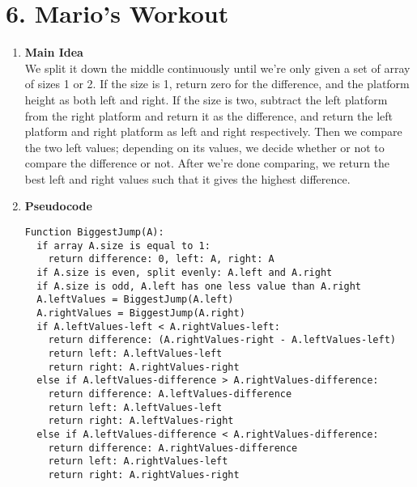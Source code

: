 \documentclass[11pt]{article}
\newenvironment{qparts}{\begin{enumerate}[{(}a{)}]}{\end{enumerate}}
\begin{document}
\section*{6. Mario's Workout}
\begin{qparts}
	\item[] \textbf{Main Idea} \\
		We split it down the middle continuously until we're only given a set of array of sizes 1 or 2. If the size is 1, return zero for the difference, and the platform height as both left and right. If the size is two, subtract the left platform from the right platform and return it as the difference, and return the left platform and right platform as left and right respectively. Then we compare the two left values; depending on its values, we decide whether or not to compare the difference or not. After we're done comparing, we return the best left and right values such that it gives the highest difference.
	\item[] \textbf{Pseudocode} \\
		\begin{minipage}{\linewidth}
		\begin{lstlisting}
Function BiggestJump(A):
  if array A.size is equal to 1:
    return difference: 0, left: A, right: A
  if A.size is even, split evenly: A.left and A.right
  if A.size is odd, A.left has one less value than A.right
  A.leftValues = BiggestJump(A.left)
  A.rightValues = BiggestJump(A.right)
  if A.leftValues-left < A.rightValues-left:
    return difference: (A.rightValues-right - A.leftValues-left)
    return left: A.leftValues-left
    return right: A.rightValues-right
  else if A.leftValues-difference > A.rightValues-difference:
    return difference: A.leftValues-difference
    return left: A.leftValues-left
    return right: A.leftValues-right
  else if A.leftValues-difference < A.rightValues-difference:
    return difference: A.rightValues-difference
    return left: A.rightValues-left
    return right: A.rightValues-right
		\end{lstlisting}
		\end{minipage}
		

\end{qparts}
\end{document}
